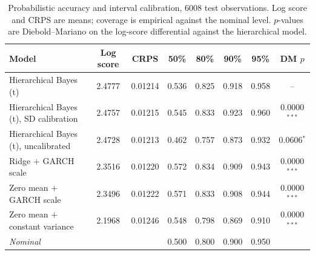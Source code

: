 \begin{table}[htbp]
\centering
\caption{Probabilistic accuracy and interval calibration, 6008 test observations. Log score and CRPS are means; coverage is empirical against the nominal level. $p$-values are Diebold--Mariano on the log-score differential against the hierarchical model.}
\label{tab:probabilistic}
\begin{tabular}{l S[table-format=1.4] S[table-format=1.5] S[table-format=1.3] S[table-format=1.3] S[table-format=1.3] S[table-format=1.3] c}
\toprule
Model & {Log score} & {CRPS} & {50\%} & {80\%} & {90\%} & {95\%} & {DM $p$} \\
\midrule
Hierarchical Bayes (t) & 2.4777 & 0.01214 & 0.536 & 0.825 & 0.918 & 0.958 & -- \\
Hierarchical Bayes (t), SD calibration & 2.4757 & 0.01215 & 0.545 & 0.833 & 0.923 & 0.960 & 0.0000$^{***}$ \\
Hierarchical Bayes (t), uncalibrated & 2.4728 & 0.01213 & 0.462 & 0.757 & 0.873 & 0.932 & 0.0606$^{*}$ \\
Ridge $+$ GARCH scale & 2.3516 & 0.01220 & 0.572 & 0.834 & 0.909 & 0.943 & 0.0000$^{***}$ \\
Zero mean $+$ GARCH scale & 2.3496 & 0.01222 & 0.571 & 0.833 & 0.908 & 0.944 & 0.0000$^{***}$ \\
Zero mean $+$ constant variance & 2.1968 & 0.01246 & 0.548 & 0.798 & 0.869 & 0.910 & 0.0000$^{***}$ \\
\midrule
\textit{Nominal} & & & 0.500 & 0.800 & 0.900 & 0.950 & \\
\bottomrule
\end{tabular}
\end{table}